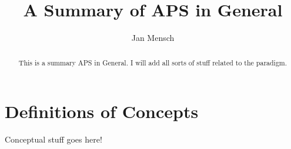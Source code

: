 \documentclass[runningheads]{llncs}
\newcommand{\papertitle}{APS in General}
\begin{document}
%
\title{A Summary of \papertitle}
%
%
\author{Jan Mensch}
%
%



%
\maketitle              %
%
\begin{abstract}
This is a summary \papertitle. I will add all sorts of stuff related to the paradigm.  



\end{abstract}
%
%
%

\section{Definitions of Concepts}

Conceptual stuff goes here!
\end{document}
